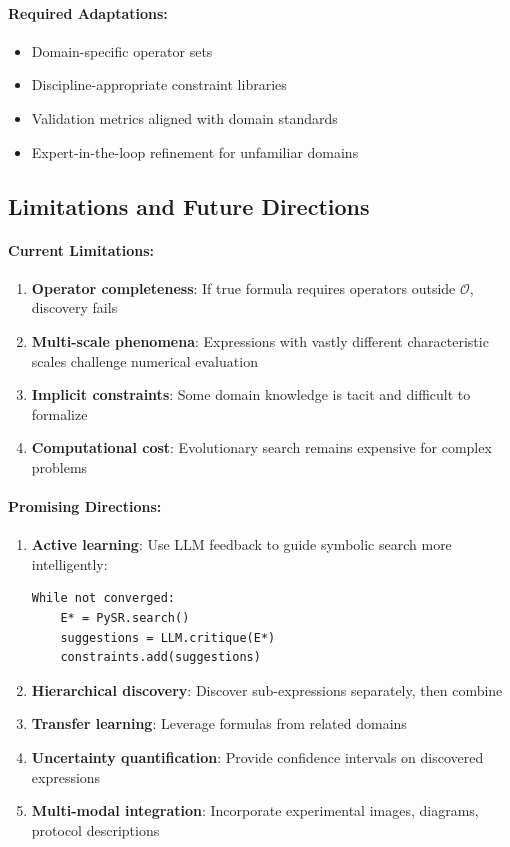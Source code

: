 \documentclass[twoside,11pt]{article}
\begin{document}
\paragraph{Required Adaptations:}
\begin{itemize}
\item Domain-specific operator sets
\item Discipline-appropriate constraint libraries
\item Validation metrics aligned with domain standards
\item Expert-in-the-loop refinement for unfamiliar domains
\end{itemize}

\subsection{Limitations and Future Directions}

\paragraph{Current Limitations:}

\begin{enumerate}
\item \textbf{Operator completeness}: If true formula requires operators outside $\mathcal{O}$, discovery fails
\item \textbf{Multi-scale phenomena}: Expressions with vastly different characteristic scales challenge numerical evaluation
\item \textbf{Implicit constraints}: Some domain knowledge is tacit and difficult to formalize
\item \textbf{Computational cost}: Evolutionary search remains expensive for complex problems
\end{enumerate}

\paragraph{Promising Directions:}

\begin{enumerate}
\item \textbf{Active learning}: Use LLM feedback to guide symbolic search more intelligently:
\begin{verbatim}
While not converged:
    E* = PySR.search()
    suggestions = LLM.critique(E*)
    constraints.add(suggestions)
\end{verbatim}

\item \textbf{Hierarchical discovery}: Discover sub-expressions separately, then combine
\item \textbf{Transfer learning}: Leverage formulas from related domains
\item \textbf{Uncertainty quantification}: Provide confidence intervals on discovered expressions
\item \textbf{Multi-modal integration}: Incorporate experimental images, diagrams, protocol descriptions
\end{enumerate}
\end{document}
